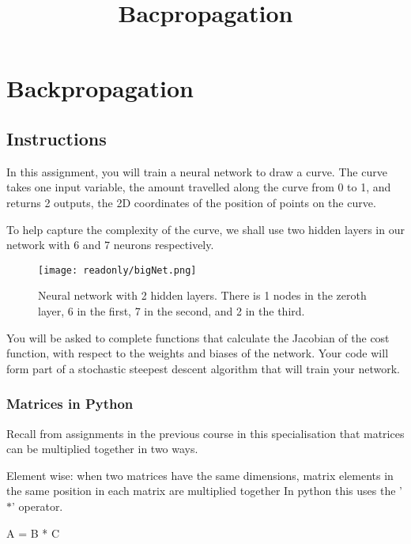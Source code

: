 \documentclass[11pt]{article}
\title{Bacpropagation}
\makeatletter
\def\maxwidth{\ifdim\Gin@nat@width>\linewidth\linewidth
    \else\Gin@nat@width\fi}
\let\Oldincludegraphics\includegraphics
\renewcommand{\includegraphics}[1]{\Oldincludegraphics[width=.8\maxwidth]{#1}}
\newenvironment{Shaded}{}{}
\newcommand{\NormalTok}[1]{{#1}}
\newcommand{\OperatorTok}[1]{\textcolor[rgb]{0.40,0.40,0.40}{{#1}}}
\makeatother
\begin{document}
    
    
    \maketitle
    
    

    
    \section{Backpropagation}\label{backpropagation}

\subsection{Instructions}\label{instructions}

In this assignment, you will train a neural network to draw a curve. The
curve takes one input variable, the amount travelled along the curve
from 0 to 1, and returns 2 outputs, the 2D coordinates of the position
of points on the curve.

To help capture the complexity of the curve, we shall use two hidden
layers in our network with 6 and 7 neurons respectively.

\begin{figure}
\centering
\texttt{[image: readonly/bigNet.png]}
\caption{Neural network with 2 hidden layers. There is 1 nodes in the
zeroth layer, 6 in the first, 7 in the second, and 2 in the third.}
\end{figure}

You will be asked to complete functions that calculate the Jacobian of
the cost function, with respect to the weights and biases of the
network. Your code will form part of a stochastic steepest descent
algorithm that will train your network.

\subsubsection{Matrices in Python}\label{matrices-in-python}

Recall from assignments in the previous course in this specialisation
that matrices can be multiplied together in two ways.

Element wise: when two matrices have the same dimensions, matrix
elements in the same position in each matrix are multiplied together In
python this uses the '\(*\)' operator.

\begin{Shaded}
\begin{Highlighting}[]
\NormalTok{A }\OperatorTok{=}\NormalTok{ B }\OperatorTok{*}\NormalTok{ C}
\end{Highlighting}
\end{Shaded}
\end{document}
